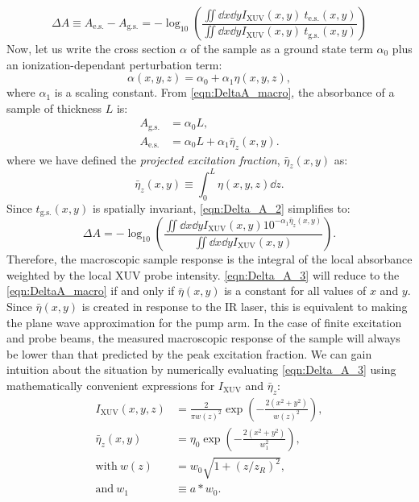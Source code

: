 \begin{equation}
\Delta A \equiv A_{\textrm{e.s.}} - A_{\textrm{g.s.}} = - \log_{10} \left( \frac{\iint \dd{x} \dd{y} I_{\textrm{XUV}}(x,y) \ t_{\textrm{e.s.}}(x,y)}{\iint \dd{x} \dd{y} I_{\textrm{XUV}}(x,y) \ t_{\textrm{g.s.}}(x,y)} \right)
\label{eqn:Delta_A_2}
\end{equation}
Now, let us write the cross section $\alpha$ of the sample as a ground state term $\alpha_0$ plus an ionization-dependant perturbation term:
\begin{equation}
\alpha(x,y,z) = \alpha_0 + \alpha_1 \eta(x,y,z),
\end{equation}
where $\alpha_1$ is a scaling constant. From \cref{eqn:DeltaA_macro}, the absorbance of a sample of thickness $L$ is:
\begin{equation}
\begin{aligned}
A_{\textrm{g.s.}} &= \alpha_0 L, \\
A_{\textrm{e.s.}} &= \alpha_0 L + \alpha_1 \bar{\eta}_z(x,y).
\end{aligned}
\end{equation}
where we have defined the \textit{projected excitation fraction}, $\bar{\eta}_z(x,y)$ as:
\begin{equation}
\bar{\eta}_z(x,y) \equiv \int_{0}^{L} \eta(x,y,z) \dd{z}.
\label{eqn:eta_z}
\end{equation}
Since $t_{\textrm{g.s.}}(x,y)$ is spatially invariant, \cref{eqn:Delta_A_2} simplifies to:
\begin{equation}
\Delta A = -\log_{10} \left( \frac{ \iint \dd{x} \dd{y} I_{\textrm{XUV}}(x,y) 10^{- \alpha_1 \bar{\eta}_z(x,y)}}{ \iint \dd{x} \dd{y} I_{\textrm{XUV}}(x,y)} \right).
\label{eqn:Delta_A_3}
\end{equation}
Therefore, the macroscopic sample response is the integral of the local absorbance weighted by the local XUV probe intensity. \cref{eqn:Delta_A_3} will reduce to the \cref{eqn:DeltaA_macro} if and only if $\bar{\eta}(x,y)$ is a constant for all values of $x$ and $y$. Since $\bar{\eta}(x,y)$ is created in response to the IR laser, this is equivalent to making the plane wave approximation for the pump arm. In the case of finite excitation and probe beams, the measured macroscopic response of the sample will always be lower than that predicted by the peak excitation fraction. We can gain intuition about the situation by numerically evaluating \cref{eqn:Delta_A_3} using mathematically convenient expressions for $I_{\textrm{XUV}}$ and $\bar{\eta}_z$:
\begin{equation}
\begin{aligned}
I_{\textrm{XUV}} (x,y,z) &= \frac{2}{\pi w(z)^2} \exp \left( - \frac{2 (x^2 + y^2)}{w(z)^2} \right), \\
\bar{\eta}_z(x,y) &= \eta_0 \exp \left( -\frac{2(x^2 + y^2)}{w_1^2} \right), \\
\textrm{with} \ w(z) &= w_0 \sqrt{1 + (z/z_R)^2}, \\
\textrm{and} \ w_1 &\equiv a*w_0.
\end{aligned}
\label{eqn:XUV_eta_expressions}
\end{equation}
